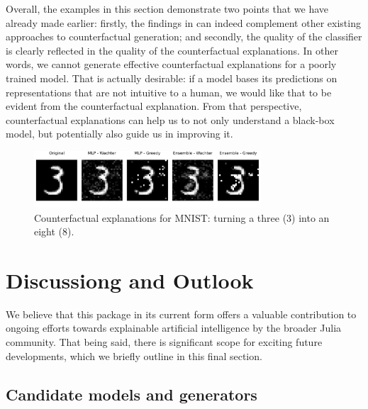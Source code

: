 \documentclass{juliacon}
\begin{document}
Overall, the examples in this section demonstrate two points that we
have already made earlier: firstly, the findings in
\cite{schut2021generating} can indeed complement other existing
approaches to counterfactual generation; and secondly, the quality of
the classifier is clearly reflected in the quality of the counterfactual
explanations. In other words, we cannot generate effective
counterfactual explanations for a poorly trained model. That is actually
desirable: if a model bases its predictions on representations that are
not intuitive to a human, we would like that to be evident from the
counterfactual explanation. From that perspective, counterfactual
explanations can help us to not only understand a black-box model, but
potentially also guide us in improving it.

\begin{figure}

{\centering \includegraphics[width=3.33333in,height=0.83333in]{www/mnist_3_to_8.png}

}

\caption{\label{fig-mnist-3to8}Counterfactual explanations for MNIST:
turning a three (3) into an eight (8).}

\end{figure}

\hypertarget{sec-outlook}{%
\section{Discussiong and Outlook}\label{sec-outlook}}

We believe that this package in its current form offers a valuable
contribution to ongoing efforts towards explainable artificial
intelligence by the broader Julia community. That being said, there is
significant scope for exciting future developments, which we briefly
outline in this final section.

\hypertarget{candidate-models-and-generators}{%
\subsection{Candidate models and
generators}\label{candidate-models-and-generators}}
\end{document}
